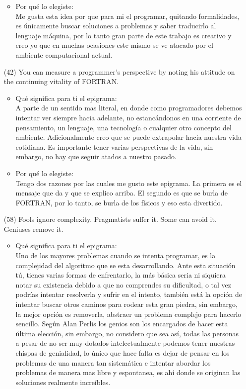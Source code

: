 \documentclass{article}
\begin{document}
\begin{itemize}
\begin{itemize}
        \item Por qué lo elegiste:\\
        Me gusta esta idea por que para mi el programar, quitando formalidades, es únicamente buscar soluciones a problemas y saber traducirlo al lenguaje máquina, por lo tanto gran parte de este trabajo es creativo y creo yo que en muchas ocasiones este mismo se ve atacado por el ambiente computacional actual.
    \end{itemize}
    \item[(42)]You can measure a programmer’s perspective by noting his attitude on the continuing vitality of FORTRAN.
    \begin{itemize}
        \item Qué significa para ti el epigrama:\\
        A parte de un sentido mas literal, en donde como programadores debemos intentar ver siempre hacia adelante, no estancándonos en una corriente de pensamiento, un lenguaje, una tecnología o cualquier otro concepto del ambiente. Adicionalmente creo que se puede extrapolar hacia nuestra vida cotidiana. Es importante tener varias perspectivas de la vida, sin embargo, no hay que seguir atados a nuestro pasado.
        \item Por qué lo elegiste:\\
        Tengo dos razones por las cuales me gusto este epigrama. La primera es el mensaje que da y que se explico arriba. El segundo es que se burla de FORTRAN, por lo tanto, se burla de los físicos y eso esta divertido.
    \end{itemize}
    \item[(58)]Fools ignore complexity. Pragmatists suffer it. Some can avoid it. Geniuses remove it.
    \begin{itemize}
        \item Qué significa para ti el epigrama:\\
        Uno de los mayores problemas cuando se intenta programar, es la complejidad del algoritmo que se esta desarrollando. Ante esta situación tú, tienes varias formas de enfrentarlo, la más básica seria ni siquiera notar su existencia debido a que no comprendes su dificultad, o tal vez podrías intentar resolverla y sufrir en el intento, también está la opción de intentar buscar otros caminos para rodear esta gran piedra, sin embargo, la mejor opción es removerla, abstraer un problema complejo para hacerlo sencillo. Según Alan Perlis los genios son los encargados de hacer esta última elección, sin embargo, no considero que sea así, todas las personas a pesar de no ser muy dotados intelectualmente podemos tener nuestras chispas de genialidad, lo único que hace falta es dejar de pensar en los problemas de una manera tan sistemática e intentar abordar los problemas de manera mas libre y espontanea, es ahí donde se originan las soluciones realmente increíbles.

\end{itemize}
\end{itemize}
\end{document}
